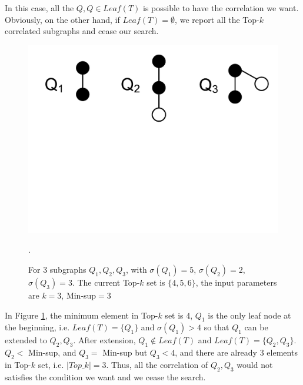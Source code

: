 In this case, all the $Q,Q\in Leaf(T)$ is possible to have the correlation we want. Obviously, on the other hand, if $Leaf(T)=\emptyset$, we report all the {\sf Top-$k$} correlated subgraphs and cease our search.
\begin{figure}[t!]
\centering
\includegraphics[scale=0.32]{images/ceasing_condition}
\vspace{-2mm}
\caption{\scriptsize For 3 subgraphs $Q_1,Q_2,Q_3$, with $\sigma(Q_1)=5$, $\sigma(Q_2)=2$, $\sigma(Q_3)=3$. The current {\sf Top-$k$} set is $\{4,5,6\}$, the input parameters are $k=3$, {\sf Min-sup}$=3$}.
\label{fig:ceasing_condition}
\vspace{-6mm}
\end{figure}
\begin{exple}
	In Figure \ref{fig:ceasing_condition}, the minimum element in {\sf Top-$k$} set is $4$, $Q_1$ is the only leaf node at the beginning, i.e. $Leaf(T)=\{Q_1\}$ and $\sigma(Q_1)>4$ so that $Q_1$ can be extended to $Q_2,Q_3$. After extension, $Q_1\notin Leaf(T)$ and $Leaf(T)=\{Q_2,Q_3\}$. $Q_2<$ {\sf Min-sup}, and $Q_3=$ {\sf Min-sup} but $Q_3<4$, and there are already $3$ elements in {\sf Top-$k$} set, i.e. $|Top\_k|=3$. Thus, all the correlation of $Q_2,Q_3$ would not satisfies the condition we want and we cease the search.
\end{exple}
